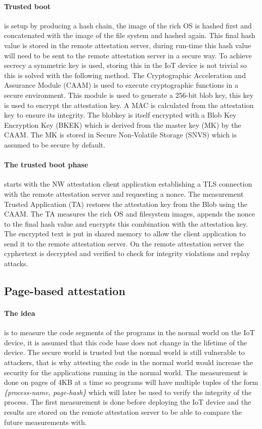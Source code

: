 \paragraph*{Trusted boot}
is setup by producing a hash chain, the image of the rich OS is hashed first and concatenated with the image of the file system and hashed again. This final hash value is stored in the remote attestation server, during run-time this hash value will need to be sent to the remote attestation server in a secure way. To achieve secrecy a symmetric key is used, storing this in the IoT device is not trivial so this is solved with the following method. The Cryptographic Acceleration and Assurance Module (CAAM) is used to execute cryptographic functions in a secure environment. This module is used to generate a 256-bit blob key, this key is used to encrypt the attestation key. A MAC is calculated from the attestation key to ensure its integrity. The blobkey is itself encrypted with a Blob Key Encryption Key (BKEK) which is derived from the master key (MK) by the CAAM. The MK is stored in Secure Non-Volatile Storage (SNVS) which is assumed to be secure by default.

\paragraph*{The trusted boot phase}
starts with the NW attestation client application establishing a TLS connection with the remote attestation server and requesting a nonce. The measurement Trusted Application (TA) restores the attestation key from the Blob using the CAAM. The TA measures the rich OS and filesystem images, appends the nonce to the final hash value and encrypts this combination with the attestation key. The encrypted text is put in shared memory to allow the client application to send it to the remote attestation server. On the remote attestation server the cyphertext is decrypted and verified to check for integrity violations and replay attacks.

\subsection*{Page-based attestation}

\paragraph*{The idea}
is to measure the code segments of the programs in the normal world on the IoT device, it is assumed that this code base does not change in the lifetime of the device. The secure world is trusted but the normal world is still vulnerable to attackers, that is why attesting the code in the normal world would increase the security for the applications running in the normal world. The measurement is done on pages of 4KB at a time so programs will have multiple tuples of the form \textit{\{process-name, page-hash\}} which will later be used to verify the integrity of the process. The first measurement is done before deploying the IoT device and the results are stored on the remote attestation server to be able to compare the future measurements with. 

